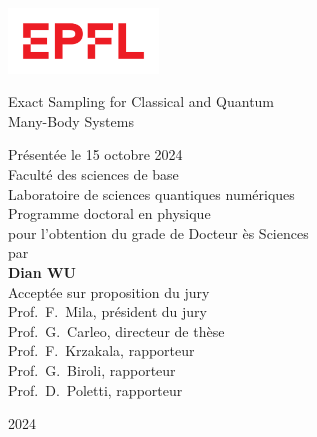 
\begin{titlepage}
\begin{otherlanguage}{french}

\sffamily

\begin{flushleft}
\parbox{0.3\textwidth}{\includegraphics[width=4cm]{images/epfl}}
\end{flushleft}

\begin{flushright}
\phantom{Thèse n.~TODO}
\end{flushright}

\null\vspace{2cm}

\begin{minipage}{4cm}
\end{minipage}
\hfill
\begin{minipage}{11cm}
{\Large Exact Sampling for Classical and Quantum \\[8pt] Many-Body Systems} \\

\vspace{2cm}

\small
Présentée le 15 octobre 2024 \\[8pt]
Faculté des sciences de base \\
Laboratoire de sciences quantiques numériques \\
Programme doctoral en physique \\

pour l'obtention du grade de Docteur ès Sciences \\[8pt]
par \\ [12pt]
{\Large \textbf{Dian WU}} \\[9pt]

Acceptée sur proposition du jury \\[4pt]
Prof.\ F.\ Mila, président du jury \\
Prof.\ G.\ Carleo, directeur de thèse \\
Prof.\ F.\ Krzakala, rapporteur \\
Prof.\ G.\ Biroli, rapporteur \\
Prof.\ D.\ Poletti, rapporteur \\
\end{minipage}
\vspace{2cm}
\begin{flushright}
2024
\end{flushright}

\end{otherlanguage}
\end{titlepage}
